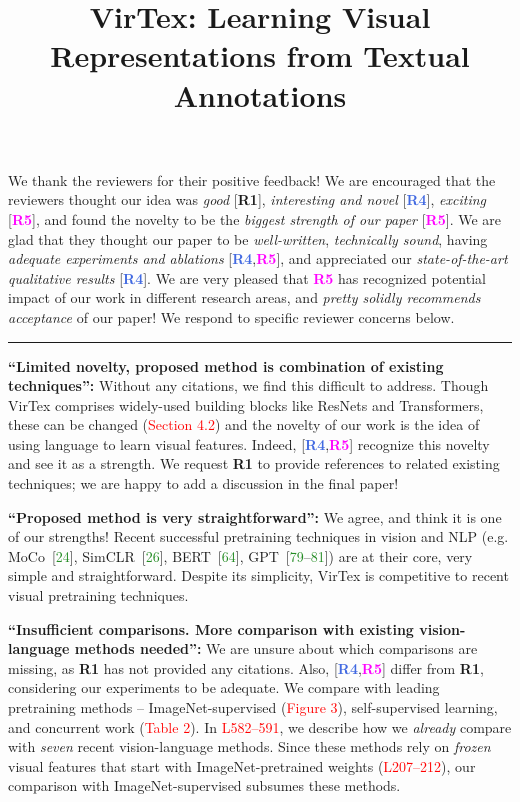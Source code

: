\documentclass[rebuttal]{cvpr}
\newcommand{\virtex}[0]{VirTex}
\newcommand{\rfour}{\textcolor{RoyalBlue}{\textbf{R4}}}
\newcommand{\rone}{\textcolor{RawSienna}{\textbf{R1}}}
\newcommand{\rfive}{\textcolor{Magenta}{\textbf{R5}}}
\newcommand{\fakeref}[1]{\textcolor{Red}{#1}}
\newcommand{\fakecite}[1]{\textcolor{ForestGreen}{#1}}
\begin{document}
\title{VirTex: Learning Visual Representations from Textual Annotations}
\maketitle

\noindent We thank the reviewers for their positive feedback!
We are encouraged that the reviewers thought our idea was \emph{good} [\rone], \emph{interesting and novel} [\rfour], \emph{exciting} [\rfive], and found the novelty to be the \emph{biggest strength of our paper} [\rfive].
We are glad that they thought our paper to be \emph{well-written}, \emph{technically sound}, having \emph{adequate experiments and ablations} [\rfour,\rfive], and appreciated our \emph{state-of-the-art qualitative results} [\rfour].
We are very pleased that \rfive{} has recognized potential impact of our work in different research areas, and \emph{pretty solidly recommends acceptance} of our paper!
We respond to specific reviewer concerns below.

\vspace{-5pt}
\noindent \rule{\linewidth}{0.5pt}



\noindent [\rone] \textbf{``Limited novelty, proposed method is combination of existing techniques'':}
Without any citations, we find this difficult to address.
Though \virtex{} comprises widely-used building blocks like ResNets and Transformers,
these can be changed (\fakeref{Section 4.2}) and
the novelty of our work is the idea of using language to learn visual features.
Indeed, [\rfour,\rfive] recognize this novelty and see it as a strength.
We request \rone{} to provide references to related existing techniques; we are happy to add a discussion in the final paper!

\noindent [\rone] \textbf{``Proposed method is very straightforward'':}
We agree, and think it is one of our strengths!
Recent successful pretraining techniques in vision and NLP (e.g. MoCo~[\fakecite{24}], SimCLR~[\fakecite{26}], BERT~[\fakecite{64}], GPT~[\fakecite{79}--\fakecite{81}]) are at their core, very simple and straightforward.
Despite its simplicity, \virtex{} is competitive to recent visual pretraining techniques.

\noindent [\rone] \textbf{``Insufficient comparisons. More comparison with existing vision-language methods needed'':}
We are unsure about which comparisons are missing, as \rone{} has not provided any citations.
Also, [\rfour,\rfive] differ from \rone, considering our experiments to be adequate.
We compare with leading pretraining methods --
ImageNet-supervised (\fakeref{Figure 3}), self-supervised learning, and concurrent work (\fakeref{Table 2}).
In \fakeref{L582--591}, we describe how we \emph{already} compare with \emph{seven} recent vision-language methods.
Since these methods rely on \emph{frozen} visual features that start with ImageNet-pretrained weights (\fakeref{L207--212}), our comparison with ImageNet-supervised  subsumes these methods.
\end{document}
